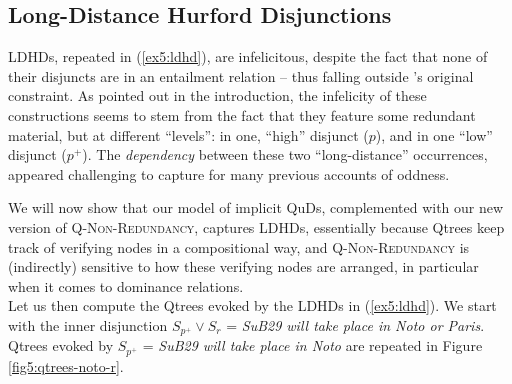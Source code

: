 \subsection{Long-Distance Hurford Disjunctions}

LDHDs, repeated in (\ref{ex5:ldhd}), are infelicitous, despite the fact that none of their disjuncts are in an entailment relation -- thus falling outside \citeauthor{Hurford1974}'s original constraint. As pointed out in the introduction, the infelicity of these constructions seems to stem from the fact that they feature some redundant material, but at different ``levels'': in one, ``high'' disjunct ($p$), and in one ``low'' disjunct ($p^+$). The \textit{dependency} between these two ``long-distance'' occurrences, appeared challenging to capture for many previous accounts of oddness.

\begin{exe}
	\begin{xlist}
	\end{xlist}
\end{exe}

We will now show that our model of implicit QuDs, complemented with our new version of \textsc{Q-Non-Redundancy}, captures LDHDs, essentially because Qtrees keep track of verifying nodes in a compositional way, and \textsc{Q-Non-Redundancy} is (indirectly) sensitive to how these verifying nodes are arranged, in particular when it comes to dominance relations.\\

Let us then compute the Qtrees evoked by the LDHDs in (\ref{ex5:ldhd}). We start with the inner disjunction $S_{p^+}\vee S_r$ = \textit{SuB29 will take place in Noto or Paris}. Qtrees evoked by $S_{p^+}$ = \textit{SuB29 will take place in Noto} are repeated in Figure \ref{fig5:qtrees-noto-r}.

